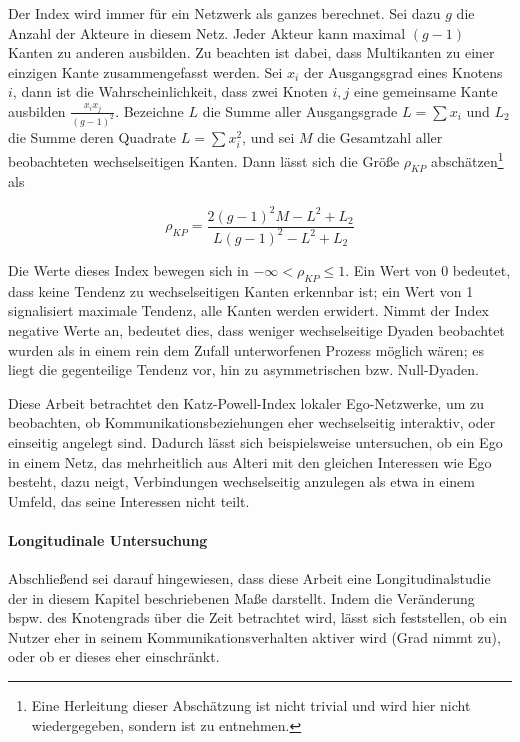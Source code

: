 \documentclass[11pt,a4paper,twoside]{article}
\let\rmarkdownfootnote\footnote%
\def\footnote{\protect\rmarkdownfootnote}
\let\oldpar\paragraph
\renewcommand{\paragraph}{\oldpar*}
\begin{document}
Der Index wird immer für ein Netzwerk als ganzes berechnet. Sei dazu
\(g\) die Anzahl der Akteure in diesem Netz. Jeder Akteur kann maximal
\((g - 1)\) Kanten zu anderen ausbilden. Zu beachten ist dabei, dass
Multikanten zu einer einzigen Kante zusammengefasst werden. Sei \(x_i\)
der Ausgangsgrad eines Knotens \(i\), dann ist die Wahrscheinlichkeit,
dass zwei Knoten \(i, j\) eine gemeinsame Kante ausbilden
\(\frac{x_i x_j}{(g-1)^2}\). Bezeichne \(L\) die Summe aller
Ausgangsgrade \(L = \sum{x_i}\) und \(L_2\) die Summe deren Quadrate
\(L = \sum{x_i^2}\), und sei \(M\) die Gesamtzahl aller beobachteten
wechselseitigen Kanten. Dann lässt sich die Größe \(\rho_{KP}\)
abschätzen\footnote{Eine Herleitung dieser Abschätzung ist nicht trivial
  und wird hier nicht wiedergegeben, sondern ist \autocite{Katz1955} zu
  entnehmen.} als

\begin{equation}
\rho_{KP} = \frac{2(g-1)^2M-L^2+L_2}{L(g-1)^2-L^2+L_2}
\label{eq:rhokp}
\end{equation}

Die Werte dieses Index bewegen sich in \(-\infty < \rho_{KP} \leq 1\).
Ein Wert von 0 bedeutet, dass keine Tendenz zu wechselseitigen Kanten
erkennbar ist; ein Wert von 1 signalisiert maximale Tendenz, alle Kanten
werden erwidert. Nimmt der Index negative Werte an, bedeutet dies, dass
weniger wechselseitige Dyaden beobachtet wurden als in einem rein dem
Zufall unterworfenen Prozess möglich wären; es liegt die gegenteilige
Tendenz vor, hin zu asymmetrischen bzw. Null-Dyaden.

Diese Arbeit betrachtet den Katz-Powell-Index lokaler Ego-Netzwerke, um
zu beobachten, ob Kommunikationsbeziehungen eher wechselseitig
interaktiv, oder einseitig angelegt sind. Dadurch lässt sich
beispielsweise untersuchen, ob ein Ego in einem Netz, das mehrheitlich
aus Alteri mit den gleichen Interessen wie Ego besteht, dazu neigt,
Verbindungen wechselseitig anzulegen als etwa in einem Umfeld, das seine
Interessen nicht teilt.

\hypertarget{longitudinale-untersuchung}{%
\paragraph{Longitudinale
Untersuchung}\label{longitudinale-untersuchung}}

Abschließend sei darauf hingewiesen, dass diese Arbeit eine
Longitudinalstudie der in diesem Kapitel beschriebenen Maße darstellt.
Indem die Veränderung bspw. des Knotengrads über die Zeit betrachtet
wird, lässt sich feststellen, ob ein Nutzer eher in seinem
Kommunikationsverhalten aktiver wird (Grad nimmt zu), oder ob er dieses
eher einschränkt.
\end{document}

